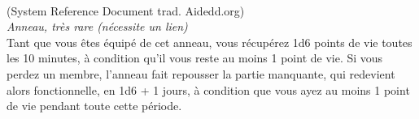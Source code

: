 \\
{\small (System Reference Document trad. Aidedd.org)}\\
{\small \it Anneau, très rare (nécessite un lien)}\\
Tant que vous êtes équipé de cet anneau, vous récupérez 1d6 points de vie toutes les 10 minutes, à condition qu'il vous reste au moins 1 point de vie. Si vous perdez un membre, l'anneau fait repousser la partie manquante, qui redevient alors fonctionnelle, en 1d6 + 1 jours, à condition que vous ayez au moins 1 point de vie pendant toute cette période. \\

